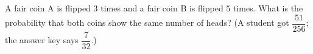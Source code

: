 A fair coin A is flipped $3$ times and a fair coin B is flipped $5$ times. What is the probability that both coins show the same number of heads? (A student got $\dfrac{51}{256}$; the answer key says $\dfrac{7}{32}$.)
